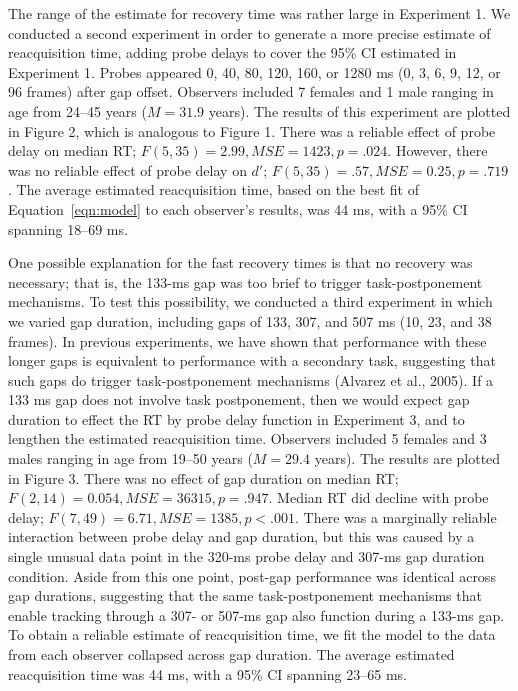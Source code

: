 \documentclass[doc]{apa}
\newcommand{\MSE}{\ensuremath{\mathit{MSE}}}
\begin{document}
The range of the estimate for recovery time was rather large in Experiment
1.  We conducted a second experiment in order to generate a more precise
estimate of reacquisition time, adding probe delays to cover the 95\% CI
estimated in Experiment 1.  Probes appeared 0, 40, 80, 120, 160, or 1280 ms
(0, 3, 6, 9, 12, or 96 frames) after gap offset.  Observers included 7
females and 1 male ranging in age from 24--45 years ($M = 31.9$ years).
The results of this experiment are plotted in Figure 2, which is analogous
to Figure 1.  There was a reliable effect of probe delay on median RT;
$F(5, 35) = 2.99, \MSE = 1423, p = .024$.  However, there was no reliable
effect of probe delay on $d'$; $F(5, 35) = .57, \MSE = 0.25, p = .719$.
The average estimated reacquisition time, based on the best fit of
Equation~\ref{eqn:model} to each observer's results, was 44 ms, with a 95\%
CI spanning 18--69 ms.

One possible explanation for the fast recovery times is that no recovery
was necessary; that is, the 133-ms gap was too brief to trigger
task-postponement mechanisms.  To test this possibility, we conducted a
third experiment in which we varied gap duration, including gaps of 133,
307, and 507 ms (10, 23, and 38 frames). In previous experiments, we have
shown that performance with these longer gaps is equivalent to performance
with a secondary task, suggesting that such gaps do trigger
task-postponement mechanisms (Alvarez et al., 2005).  If a 133 ms gap does
not involve task postponement, then we would expect gap duration to effect
the RT by probe delay function in Experiment 3, and to lengthen the
estimated reacquisition time.  Observers included 5 females and 3 males
ranging in age from 19--50 years ($M = 29.4$ years). The results are
plotted in Figure 3.  There was no effect of gap duration on median RT;
$F(2, 14) = 0.054, \MSE = 36315, p = .947$.  Median RT did decline with
probe delay; $F(7, 49) = 6.71, \MSE = 1385, p < .001$.  There was a
marginally reliable interaction between probe delay and gap duration, but
this was caused by a single unusual data point in the 320-ms probe delay
and 307-ms gap duration condition.  Aside from this one point, post-gap
performance was identical across gap durations, suggesting that the same
task-postponement mechanisms that enable tracking through a 307- or 507-ms
gap also function during a 133-ms gap.  To obtain a reliable estimate of
reacquisition time, we fit the model to the data from each observer
collapsed across gap duration.  The average estimated reacquisition time
was 44 ms, with a 95\% CI spanning 23--65 ms.
\end{document}
